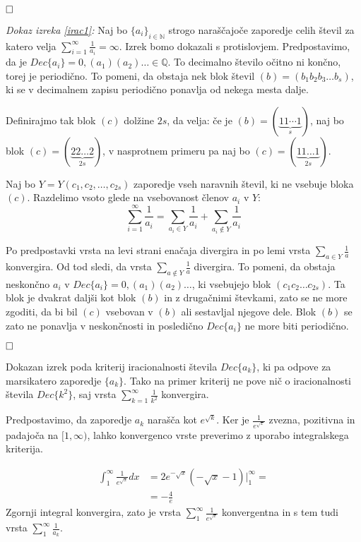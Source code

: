 \documentclass[a4paper,12pt]{article}
\def\N{\mathbb{N}} %
\def\Q{\mathbb{Q}} %
\def\qed{$\hfill\Box$}   %
\begin{document}
\qed

\noindent
{\em Dokaz izreka \ref{irac1}:\/} Naj bo $\{a_i\}_{i\in \N}$ strogo naraščajoče zaporedje
celih števil za katero velja $\sum_{i=1}^{\infty}\frac{1}{a_i} = \infty$. Izrek bomo dokazali
s protislovjem. Predpostavimo, da je $Dec\{a_i\} = 0,(a_1)(a_2) \dots \in \Q$. To decimalno
število očitno ni končno, torej je periodično. 
To pomeni, da obstaja nek blok števil $(b) = (b_1b_2b_3 \dots b_s)$,
ki se v decimalnem zapisu periodično ponavlja od nekega mesta dalje. 

Definirajmo tak blok $(c)$ dolžine $2s$, da velja: 
če je $(b) = (\underbrace{11 \cdots 1}_{s})$, naj bo blok $(c) = (\underbrace{22\dots 2}_{2s})$, 
v nasprotnem primeru pa naj bo $(c) = (\underbrace{11\dots 1}_{2s})$.

Naj bo $Y = Y(c_1, c_2, \dots, c_{2s})$ zaporedje vseh naravnih števil, 
ki ne vsebuje bloka $(c)$.
Razdelimo vsoto glede na vsebovanost členov $a_i$ v $Y$:
\[
    \sum_{i=1}^{\infty} \frac{1}{a_i} = \sum_{a_i \in Y}\frac{1}{a_i} + \sum_{a_i \notin Y} \frac{1}{a_i}
    \]

Po predpostavki vrsta na levi strani enačaja divergira in po lemi vrsta $\sum_{a \in Y}\frac{1}{a}$
konvergira. Od tod sledi, da vrsta $\sum_{a \notin Y} \frac{1}{a}$ divergira.
To pomeni, da obstaja neskončno $a_i$ v $Dec\{a_i\} = 0,(a_1)(a_2) \dots$, ki vsebujejo blok 
$(c_1c_2\dots c_{2s})$. Ta blok je dvakrat daljši kot blok $(b)$ in z drugačnimi števkami, zato se ne more
zgoditi, da bi bil $(c)$ vsebovan v $(b)$ ali sestavljal njegove dele. 
Blok $(b)$ se zato ne ponavlja v neskončnosti in posledično $Dec\{a_i\}$ ne more biti periodično.

\qed


Dokazan izrek poda kriterij iracionalnosti števila $Dec\{a_k\}$,
ki pa odpove za marsikatero zaporedje $\{a_k\}$.
Tako na primer kriterij ne pove nič o iracionalnosti števila $Dec\{k^2\}$, saj vrsta $\sum_{k=1}^{\infty}\frac{1}{k^2}$ konvergira.

Predpostavimo, da zaporedje $a_k$ narašča kot $e^{\sqrt{k}}$.
Ker je $\frac{1}{e^{\sqrt{x}}}$ zvezna, pozitivna in padajoča na $[1, \infty)$,
lahko konvergenco vrste preverimo z uporabo integralskega kriterija.

\[
    \begin{split}
    \int_1^{\infty}\frac{1}{e^{\sqrt{x}}}dx &= 2e^{-\sqrt{x}}(- \sqrt{x} - 1) \big|_1^{\infty} = \\
    &= -\frac{4}{e}
    \end{split}
\]
Zgornji integral konvergira, zato je vrsta $\sum_1^{\infty}\frac{1}{e^{\sqrt{x}}}$ konvergentna
in s tem tudi vrsta $\sum_1^{\infty}\frac{1}{a_k}$.
\end{document}
